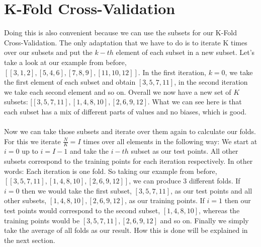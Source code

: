 \documentclass{article}
\begin{document}
\section{K-Fold Cross-Validation}
\label{sec:K-FoldCrossValidation}

Doing this is also convenient because we can use the subsets for our K-Fold Cross-Validation. The only adaptation that we have to do is to iterate K times over our subsets and put the $k-th$ element of each subset in a new subset. Let's take a look at our example from before, $[[3,1,2],[5,4,6],[7,8,9],[11,10,12]]$. In the first iteration, $k=0$, we take the first element of each subset and obtain $[3,5,7,11]$, in the second iteration we take each second element and so on. Overall we now have a new set of $K$ subsets: $[[3,5,7,11],[1,4,8,10],[2,6,9,12]$. What we can see here is that each subset has a mix of different parts of values and no biases, which is good. \\
\\
Now we can take those subsets and iterate over them again to calculate our folds. For this we iterate $\frac{N}{K} = I$ times over all elements in the following way: We start at $i = 0$ up to $i = I-1$ and take the $i-th$ subset as our test points. All other subsets correspond to the training points for each iteration respectively. In other words: Each iteration is one fold. So taking our example from before, $[[3,5,7,11],[1,4,8,10],[2,6,9,12]]$, we can produce 3 different folds. If $i = 0$ then we would take the first subset, $[3,5,7,11]$, as our test points and all other subsets, $[1,4,8,10],[2,6,9,12]$, as our training points. If $i = 1$ then our test points would correspond to the second subset, $[1,4,8,10]$, whereas the training points would be $[3,5,7,11],[2,6,9,12]$ and so on. Finally we simply take the average of all folds as our result. How this is done will be explained in the next section. 
\end{document}
